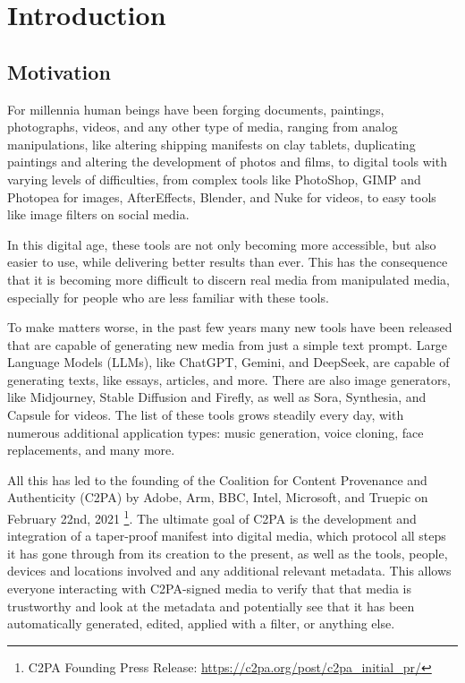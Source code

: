 \chapter{Introduction\label{cha:chapter1}}

\section{Motivation\label{sec:moti}}

For millennia human beings have been forging documents, paintings, photographs, videos, and any other type of media, ranging from analog manipulations, like altering shipping manifests on clay tablets, duplicating paintings and altering the development of photos and films, to digital tools with varying levels of difficulties, from complex tools like PhotoShop, GIMP and Photopea for images, AfterEffects, Blender, and Nuke for videos, to easy tools like image filters on social media.

In this digital age, these tools are not only becoming more accessible, but also easier to use, while delivering better results than ever. This has the consequence that it is becoming more difficult to discern real media from manipulated media, especially for people who are less familiar with these tools.

To make matters worse, in the past few years many new tools have been released that are capable of generating new media from just a simple text prompt. Large Language Models (LLMs), like ChatGPT, Gemini, and DeepSeek, are capable of generating texts, like essays, articles, and more. There are also image generators, like Midjourney, Stable Diffusion and Firefly, as well as Sora, Synthesia, and Capsule for videos. The list of these tools grows steadily every day, with numerous additional application types: music generation, voice cloning, face replacements, and many more.

All this has led to the founding of the Coalition for Content Provenance and Authenticity (C2PA) by Adobe, Arm, BBC, Intel, Microsoft, and Truepic on February 22nd, 2021 \footnote{C2PA Founding Press Release: \url{https://c2pa.org/post/c2pa_initial_pr/}}. The ultimate goal of C2PA is the development and integration of a taper-proof manifest into digital media, which protocol all steps it has gone through from its creation to the present, as well as the tools, people, devices and locations involved and any additional relevant metadata. This allows everyone interacting with C2PA-signed media to verify that that media is trustworthy and look at the metadata and potentially see that it has been automatically generated, edited, applied with a filter, or anything else.

